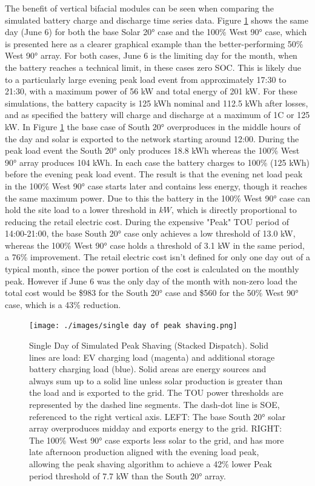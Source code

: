 \documentclass[journal,article,submit,pdftex,moreauthors]{Definitions/mdpi}
\begin{document}
The benefit of vertical bifacial modules can be seen when comparing the simulated battery charge and discharge time series data. Figure \ref{fig:peak-shaving} shows the same day (June 6) for both the base Solar 20° case and the 100\% West 90° case, which is presented here as a clearer graphical example than the better-performing 50\% West 90° array. For both cases, June 6 is the limiting day for the month, when the battery reaches a technical limit, in these cases zero SOC. This is likely due to a particularly large evening peak load event from approximately 17:30 to 21:30, with a maximum power of 56 kW and total energy of 201 kW. For these simulations, the battery capacity is 125 kWh nominal and 112.5 kWh after losses, and as specified the battery will charge and discharge at a maximum of 1C or 125 kW. In Figure \ref{fig:peak-shaving} the base case of South 20° overproduces in the middle hours of the day and solar is exported to the network starting around 12:00. During the peak load event the South 20° only produces 18.8 kWh whereas the 100\% West 90° array produces 104 kWh. In each case the battery charges to 100\% (125 kWh) before the evening peak load event. The result is that the evening net load peak in the 100\% West 90° case starts later and contains less energy, though it reaches the same maximum power. Due to this the battery in the 100\% West 90° case can hold the site load to a lower threshold in \(kW\), which is directly proportional to reducing the retail electric cost. During the expensive "Peak" TOU period of 14:00-21:00, the base South 20° case only achieves a low threshold of 13.0 kW, whereas the 100\% West 90° case holds a threshold of 3.1 kW in the same period, a 76\% improvement. The retail electric cost isn't defined for only one day out of a typical month, since the power portion of the cost is calculated on the monthly peak. However if June 6 was the only day of the month with non-zero load the total cost would be \$983 for the South 20° case and \$560 for the 50\% West 90° case, which is a 43\% reduction.

\begin{figure}[!h]
  \centering
  \texttt{[image: ./images/single day of peak shaving.png]}
  \caption{Single Day of Simulated Peak Shaving (Stacked Dispatch). Solid lines are load: EV charging load (magenta) and additional storage battery charging load (blue). Solid areas are energy sources and always sum up to a solid line unless solar production is greater than the load and is exported to the grid. The TOU power thresholds are represented by the dashed line segments. The dash-dot line is SOE, referenced to the right vertical axis. LEFT: The base South 20° solar array overproduces midday and exports energy to the grid. RIGHT: The 100\% West 90° case exports less solar to the grid, and has more late afternoon production aligned with the evening load peak, allowing the peak shaving algorithm to achieve a 42\% lower Peak period threshold of 7.7 kW than the South 20° array.}
  \label{fig:peak-shaving}
\end{figure}
\end{document}

